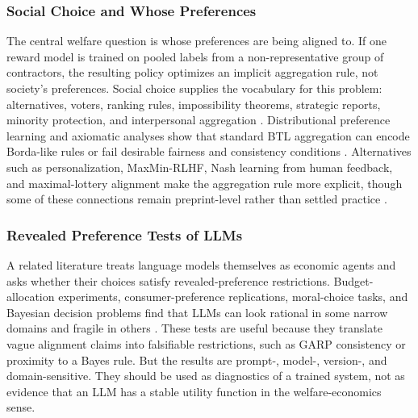 \subsubsection{Social Choice and Whose Preferences}

The central welfare question is whose preferences are being aligned to. If one reward model is trained on pooled labels from a non-representative group of contractors, the resulting policy optimizes an implicit aggregation rule, not society's preferences. Social choice supplies the vocabulary for this problem: alternatives, voters, ranking rules, impossibility theorems, strategic reports, minority protection, and interpersonal aggregation \citep{conitzer2024socialchoice,mishra2023socialchoice}. Distributional preference learning and axiomatic analyses show that standard BTL aggregation can encode Borda-like rules or fail desirable fairness and consistency conditions \citep{siththaranjan2024distributional,ge2024axioms}. Alternatives such as personalization, MaxMin-RLHF, Nash learning from human feedback, and maximal-lottery alignment make the aggregation rule more explicit, though some of these connections remain preprint-level rather than settled practice \citep{park2024heterogeneous,chakraborty2024maxmin,munos2023nash,maurarivero2025maximal}.

\subsubsection{Revealed Preference Tests of LLMs}

A related literature treats language models themselves as economic agents and asks whether their choices satisfy revealed-preference restrictions. Budget-allocation experiments, consumer-preference replications, moral-choice tasks, and Bayesian decision problems find that LLMs can look rational in some narrow domains and fragile in others \citep{chen2023rationalitygpt,golisingh2024preferences,seror2024moral,murawatrawat2025bayesian}. These tests are useful because they translate vague alignment claims into falsifiable restrictions, such as GARP consistency or proximity to a Bayes rule. But the results are prompt-, model-, version-, and domain-sensitive. They should be used as diagnostics of a trained system, not as evidence that an LLM has a stable utility function in the welfare-economics sense.

